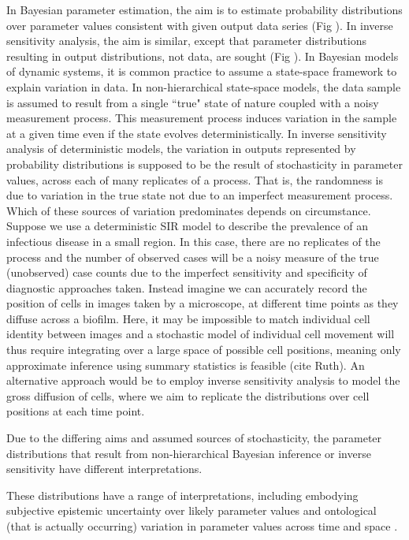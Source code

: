 \documentclass[10pt,letterpaper]{article}
\begin{document}
In Bayesian parameter estimation, the aim is to estimate probability distributions over parameter values consistent with given output data series (Fig ). In inverse sensitivity analysis, the aim is similar, except that parameter distributions resulting in output distributions, not data, are sought (Fig ). In Bayesian models of dynamic systems, it is common practice to assume a state-space framework to explain variation in data. In non-hierarchical state-space models, the data sample is assumed to result from a single ``true" state of nature coupled with a noisy measurement process. This measurement process induces variation in the sample at a given time even if the state evolves deterministically. In inverse sensitivity analysis of deterministic models, the variation in outputs represented by probability distributions is supposed to be the result of stochasticity in parameter values, across each of many replicates of a process. That is, the randomness is due to variation in the true state not due to an imperfect measurement process. Which of these sources of variation predominates depends on circumstance. Suppose we use a deterministic SIR model to describe the prevalence of an infectious disease in a small region. In this case, there are no replicates of the process and the number of observed cases will be a noisy measure of the true (unobserved) case counts due to the imperfect sensitivity and specificity of diagnostic approaches taken. Instead imagine we can accurately record the position of cells in images taken by a microscope, at different time points as they diffuse across a biofilm. Here, it may be impossible to match individual cell identity between images and a stochastic model of individual cell movement will thus require integrating over a large space of possible cell positions, meaning only approximate inference using summary statistics is feasible (cite Ruth). An alternative approach would be to employ inverse sensitivity analysis to model the gross diffusion of cells, where we aim to replicate the distributions over cell positions at each time point.

Due to the differing aims and assumed sources of stochasticity, the parameter distributions that result from non-hierarchical Bayesian inference or inverse sensitivity have different interpretations.

These distributions have a range of interpretations, including embodying subjective epistemic uncertainty over likely parameter values and ontological (that is actually occurring) variation in parameter values across time and space \cite{lambert2018Student}. 
\end{document}
